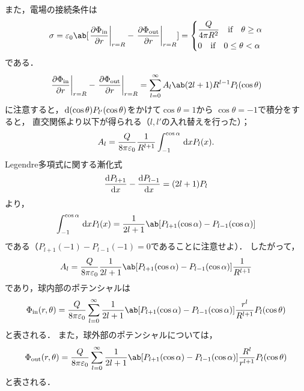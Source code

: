 また，電場の接続条件は
\begin{gather}%
  \sigma = \eps_0 \ab[\eval{\diffp{\Phi_{\text{in}}}{r}}_{r=R} -
  \eval{\diffp{\Phi_{\text{out}}}{r}}_{r=R}] 
  =
  \begin{dcases}%
    \frac{Q}{4\pi R^2} \qqtext{if} \theta \geq \alpha\\
    0 \qqtext{if} 0 \leq \theta < \alpha
  \end{dcases}%
\end{gather}%
である．
\begin{gather}%
  \eval{\diffp{\Phi_{\text{in}}}{r}}_{r=R}
  - \eval{\diffp{\Phi_{\text{out}}}{r}}_{r=R} 
  = \sum_{l=0}^\infty A_l \ab(2l+1) R^{l-1} P_l(\cos\theta)
\end{gather}%
に注意すると，$\dl{(\cos\theta)}P_{l'}(\cos\theta)$をかけて$\cos\theta =1$から
$\cos\theta = -1$で積分をすると，
直交関係より以下が得られる（$l,l'$の入れ替えを行った）；
\begin{gather}%
  A_l = \frac{Q}{8\pi \eps_0}\frac{1}{R^{l+1}} \int_{-1}^{\cos\alpha} \dl{x} P_l(x).
\end{gather}%
Legendre多項式に関する漸化式
\begin{gather}%
  \diff{P_{l+1}}{x} - \diff{P_{l-1}}{x} = (2l+1)P_l
\end{gather}%
より，
\begin{gather}%
  \int_{-1}^{\cos\alpha} \dl{x} P_l(x) 
  = \frac{1}{2l+1}\ab[P_{l+1}(\cos\alpha) - P_{l-1}(\cos\alpha)]
\end{gather}%
である（$P_{l+1}(-1) - P_{l-1}(-1) = 0$であることに注意せよ）．
したがって，
\begin{gather}%
  A_l = \frac{Q}{8\pi \eps_0} \frac{1}{2l+1} \ab[P_{l+1}(\cos\alpha) - P_{l-1}(\cos\alpha)]\frac{1}{R^{l+1}}
\end{gather}%
であり，球内部のポテンシャルは
\begin{gather}%
  \Phi_{\text{in}}(r,\theta) = \frac{Q}{8\pi \eps_0} \sum_{l=0}^\infty \frac{1}{2l+1}
  \ab[P_{l+1}(\cos\alpha) - P_{l-1}(\cos\alpha)] \frac{r^l}{R^{l+1}} P_l(\cos\theta)
\end{gather}%
と表される．
また，球外部のポテンシャルについては，
\begin{gather}%
  \Phi_{\text{out}}(r,\theta) = \frac{Q}{8\pi \eps_0} \sum_{l=0}^\infty \frac{1}{2l+1}
  \ab[P_{l+1}(\cos\alpha) - P_{l-1}(\cos\alpha)] \frac{R^l}{r^{l+1}} P_l(\cos\theta)
\end{gather}%
と表される．

